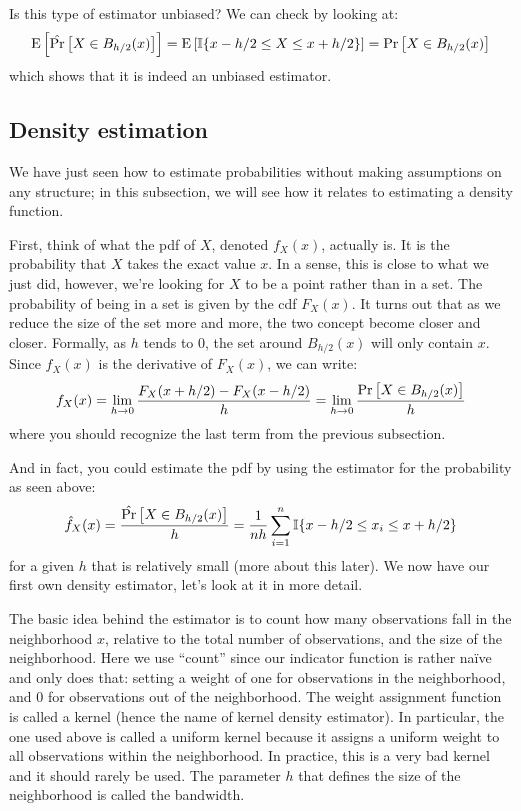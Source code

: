 Is this type of estimator unbiased? We can check by looking at: $$\operatorname{E}\left[\hat{\operatorname{Pr}}\left[ X\in B_{h/2}(x) \right]\right] = \operatorname{E}\left[\mathbb{I}\{ x - h/2 \leq X \leq x + h/2 \}\right] = \operatorname{Pr}\left[X\in B_{h/2}(x)\right] $$ which shows that it is indeed an unbiased estimator. 

\subsection{Density estimation}

We have just seen how to estimate probabilities without making assumptions on any structure; in this subsection, we will see how it relates to estimating a density function.

First, think of what the pdf of $X$, denoted $f_X(x)$, actually is. It is the probability that $X$ takes the exact value $x$. In a sense, this is close to what we just did, however, we're looking for $X$ to be a point rather than in a set. The probability of being in a set is given by the cdf $F_X(x)$. It turns out that as we reduce the size of the set more and more, the two concept become closer and closer. Formally, as $h$ tends to 0, the set around $B_{h/2}(x)$ will only contain $x$. Since $f_X(x)$ is the derivative of $F_X(x)$, we can write: $$f_X(x) = \lim_{h\to 0} \frac{F_X(x+h/2) - F_X(x-h/2)}{h} = \lim_{h\to 0} \frac{\operatorname{Pr}\left[X\in B_{h/2}(x)\right]}{h} $$ where you should recognize the last term from the previous subsection.

And in fact, you could estimate the pdf by using the estimator for the probability as seen above: $$ \hat f_X(x) = \frac{\hat{\operatorname{Pr}}\left[X\in B_{h/2}(x)\right]}{h} = \frac{1}{nh} \sum_{i=1}^{n} \mathbb{I}\{ x - h/2 \leq x_i \leq x + h/2 \} $$ for a given $h$ that is relatively small (more about this later). We now have our first own density estimator, let's look at it in more detail.

The basic idea behind the estimator is to count how many observations fall in the neighborhood $x$, relative to the total number of observations, and the size of the neighborhood. Here we use ``count'' since our indicator function is rather naïve and only does that: setting a weight of one for observations in the neighborhood, and 0 for observations out of the neighborhood. The weight assignment function is called a kernel (hence the name of kernel density estimator). In particular, the one used above is called a uniform kernel because it assigns a uniform weight to all observations within the neighborhood. In practice, this is a very bad kernel and it should rarely be used. The parameter $h$ that defines the size of the neighborhood is called the bandwidth.

